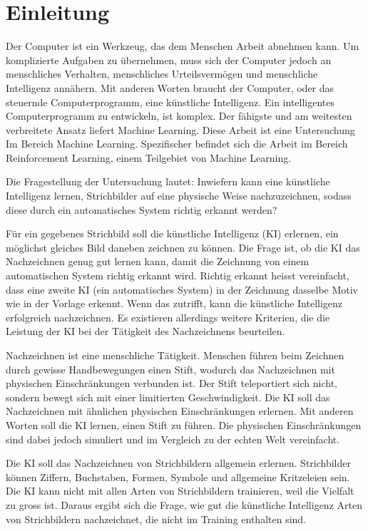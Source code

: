 \chapter{Einleitung}\label{chap:einleit}
Der Computer ist ein Werkzeug, das dem Menschen Arbeit abnehmen kann. Um
komplizierte Aufgaben zu übernehmen, muss sich der Computer jedoch an
menschliches Verhalten, menschliches Urteilsvermögen und menschliche Intelligenz
annähern. Mit anderen Worten braucht der Computer, oder das steuernde
Computerprogramm, eine künstliche Intelligenz. Ein intelligentes
Computerprogramm zu entwickeln, ist komplex. Der fähigste und am weitesten
verbreitete Ansatz liefert Machine Learning. Diese Arbeit ist eine Untersuchung
Im Bereich Machine Learning. Spezifischer befindet sich die Arbeit im Bereich
Reinforcement Learning, einem Teilgebiet von Machine Learning.
 
Die Fragestellung der Untersuchung lautet: Inwiefern kann eine künstliche
Intelligenz lernen, Strichbilder auf eine physische Weise nachzuzeichnen, sodass
diese durch ein automatisches System richtig erkannt werden?
 
Für ein gegebenes Strichbild soll die künstliche Intelligenz (KI) erlernen, ein
möglichst gleiches Bild daneben zeichnen zu können. Die Frage ist, ob die KI das
Nachzeichnen genug gut lernen kann, damit die Zeichnung von einem automatischen
System richtig erkannt wird. Richtig erkannt heisst vereinfacht,
dass eine zweite KI (ein automatisches System) in der Zeichnung dasselbe Motiv wie in der Vorlage erkennt.
Wenn das zutrifft, kann die künstliche Intelligenz erfolgreich nachzeichnen. Es
existieren allerdings weitere Kriterien, die die Leistung der KI bei der
Tätigkeit des Nachzeichnens beurteilen.
 
Nachzeichnen ist eine menschliche Tätigkeit. Menschen führen beim Zeichnen durch
gewisse Handbewegungen einen Stift, wodurch das Nachzeichnen mit physischen
Einschränkungen verbunden ist. Der Stift teleportiert sich nicht, sondern bewegt
sich mit einer limitierten Geschwindigkeit. Die KI soll das Nachzeichnen mit
ähnlichen physischen Einschränkungen erlernen. Mit anderen Worten soll die KI
lernen, einen Stift zu führen. Die physischen Einschränkungen sind dabei jedoch
simuliert und im Vergleich zu der echten Welt vereinfacht.
 
Die KI soll das Nachzeichnen von Strichbildern allgemein erlernen. Strichbilder
können Ziffern, Buchstaben, Formen, Symbole und allgemeine Kritzeleien sein. Die
KI kann nicht mit allen Arten von Strichbildern trainieren, weil die Vielfalt zu
gross ist. Daraus ergibt sich die Frage, wie gut die künstliche Intelligenz
Arten von Strichbildern nachzeichnet, die nicht im Training enthalten sind.
 
